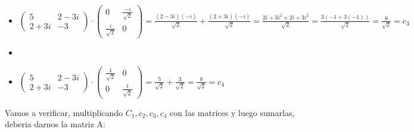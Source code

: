 \documentclass{report}
\begin{document}
\begin{enumerate}
\begin{enumerate}[label=\alph*)]
\begin{itemize}
    \item $\begin{pmatrix}
        5 &2-3i\\
        2+3i & -3
    \end{pmatrix}\cdot\begin{pmatrix}
       0& \frac{-i}{\sqrt{2}} \\
        \frac{i}{\sqrt{2}} & 0
    \end{pmatrix}=\frac{(2-3i)(-i)}{\sqrt{2}}+\frac{(2+3i)(-i)}{\sqrt{2}}=\frac{2i+3i^2+2i+3i^2}{\sqrt{2}}=\frac{3(-1+3(-1))}{\sqrt{2}}=\frac{6}{\sqrt{2}}=c_3$
    
    \item \item $\begin{pmatrix}
        5 &2-3i\\
        2+3i & -3
    \end{pmatrix}\cdot\begin{pmatrix}
        \frac{1}{\sqrt{2}}& 0 \\
        0 & \frac{1}{\sqrt{2}}
    \end{pmatrix}= \frac{5}{\sqrt{2}}+\frac{3}{\sqrt{2}}=\frac{8}{\sqrt{2}}=c_4$
    \end{itemize}
    
    Vamos a verificar, multiplicando $C_1,c_2,c_3,c_4$ con las matrices y luego sumarlas, deberia darnos la matriz A:
    

\end{enumerate}
\end{enumerate}
\end{document}
